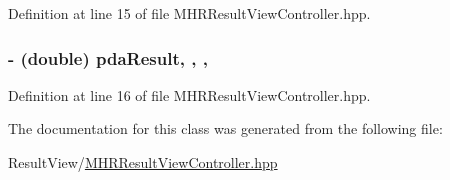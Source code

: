 Definition at line 15 of file M\+H\+R\+Result\+View\+Controller.\+hpp.

\hypertarget{interface_m_h_r_result_view_controller_ae0daab10c086e438477f71f59fa0de37}{
\subsubsection[{pda\+Result}]{\setlength{\rightskip}{0pt plus 5cm}-\/ (double) pda\+Result\hspace{0.3cm}{\ttfamily [read]}, {\ttfamily [write]}, {\ttfamily [nonatomic]}, {\ttfamily [assign]}}}\label{interface_m_h_r_result_view_controller_ae0daab10c086e438477f71f59fa0de37}


Definition at line 16 of file M\+H\+R\+Result\+View\+Controller.\+hpp.



The documentation for this class was generated from the following file\+:\begin{DoxyCompactItemize}
\item 
Result\+View/\hyperlink{_m_h_r_result_view_controller_8hpp}{M\+H\+R\+Result\+View\+Controller.\+hpp}\end{DoxyCompactItemize}
